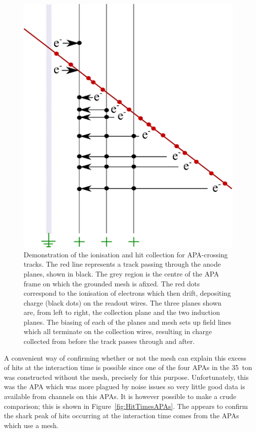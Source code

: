 \begin{figure}
  \centering
  \includegraphics[width=12cm]{MeshHits.eps}
  \caption[Demonstration of the electron ionisation and hit collection for APA-crossing tracks.]{Demonstration of the ionisation and hit collection for APA-crossing tracks.  The red line represents a track passing through the anode planes, shown in black.  The grey region is the centre of the APA frame on which the grounded mesh is afixed.  The red dots correspond to the ionisation of electrons which then drift, depositing charge (black dots) on the readout wires.  The three planes shown are, from left to right, the collection plane and the two induction planes.  The biasing of each of the planes and mesh sets up field lines which all terminate on the collection wires, resulting in charge collected from before the track passes through and after.}
  \label{fig:MeshHits}
\end{figure}

A convenient way of confirming whether or not the mesh can explain this excess of hits at the interaction time is possible since one of the four APAs in the 35~ton was constructed without the mesh, precisely for this purpose.  Unfortunately, this was the APA which was more plagued by noise issues so very little good data is available from channels on this APAs.  It is however possible to make a crude comparison; this is shown in Figure~\ref{fig:HitTimesAPAs}.  The appears to confirm the shark peak of hits occurring at the interaction time comes from the APAs which use a mesh.

